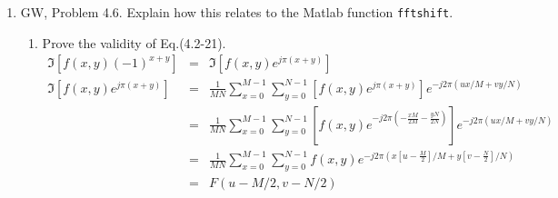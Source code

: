 \documentclass[10pt,letterpaper,oneside,onecolumn,leqno,fleqn]{article}
\begin{document}
\begin{enumerate}
    \pagebreak
    \item
      GW, Problem 4.6. Explain how this relates to the Matlab function
      \texttt{fftshift}.
      \begin{enumerate}
        \item
          Prove the validity of Eq.(4.2-21).
          \begin{eqnarray*}
            \Im\left[ f(x,y)(-1)^{x+y} \right]
            &=& \Im\left[ f(x,y)e^{j\pi(x+y)} \right] \\
            \Im\left[ f(x,y)e^{j\pi(x+y)} \right]
            &=& \frac{1}{MN} \sum_{x=0}^{M-1} \sum_{y=0}^{N-1} \left[
                f(x,y)e^{j\pi(x+y)} \right] e^{-j2\pi(ux/M+vy/N)} \\
            &=& \frac{1}{MN} \sum_{x=0}^{M-1} \sum_{y=0}^{N-1} \left[f(x,y)
                e^{-j2\pi \left( -\frac{xM}{2M}-\frac{yN}{2N} \right)} \right]
                e^{-j2\pi(ux/M+vy/N)} \\
            &=& \frac{1}{MN} \sum_{x=0}^{M-1} \sum_{y=0}^{N-1} f(x,y)
                e^{-j2\pi \left(x\left[u-\frac{M}{2}\right]/M +
                y\left[v-\frac{N}{2}\right]/N\right)} \\
            &=& F(u-M/2, v-N/2)
          \end{eqnarray*}


\end{enumerate}
\end{enumerate}
\end{document}
